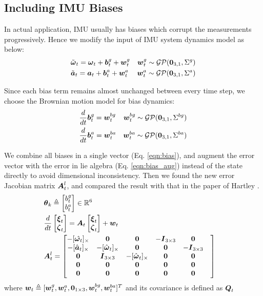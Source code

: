 \subsection{Including IMU Biases}
In actual application, IMU usually has biases which corrupt the measurements progressively. Hence we modify the input of IMU system dynamics model as below:
\begin{align}
    & \tilde{\boldsymbol{\omega}}_t = \boldsymbol{\omega}_t + \boldsymbol{b}^g_t + \boldsymbol{w}^g_t 
    & \boldsymbol{w}^g_t \sim \mathcal{GP}(\boldsymbol{0}_{3,1},\Sigma^g) \\
    & \tilde{\boldsymbol{a}}_t = \boldsymbol{a}_t + \boldsymbol{b}^a_t + \boldsymbol{w}^a_t
    & \boldsymbol{w}^a_t \sim \mathcal{GP}(\boldsymbol{0}_{3,1},\Sigma^a)
\end{align}

Since each bias term remains almost unchanged between every time step, we choose the Brownian motion model for bias dynamics: 
\begin{align}
    & \frac{d}{dt}\boldsymbol{b}^g_t = \boldsymbol{w}^{bg}_t 
    & \boldsymbol{w}^{bg}_t \sim \mathcal{GP}(\boldsymbol{0}_{3,1},\Sigma^{bg}) \\
    & \frac{d}{dt}\boldsymbol{b}^a_t = \boldsymbol{w}^{ba}_t
    & \boldsymbol{w}^{ba}_t \sim \mathcal{GP}(\boldsymbol{0}_{3,1},\Sigma^{ba})
\end{align}

We combine all biases in a single vector (Eq. \ref{eqn:bias}), and augment the error vector with the error in lie algebra (Eq. \ref{eqn:bias_aug}) instead of the state directly to avoid dimensional inconsistency. Then we found the new error Jacobian matrix $\boldsymbol{A}^l_t$, and compared the result with that in the paper of Hartley \cite{hartley2020iekf}.
\begin{align}
    &  \boldsymbol{\theta}_k \triangleq 
        \begin{bmatrix}
            b^g_t \\ b^a_t
        \end{bmatrix}
        \in \mathbb{R}^6
    &\label{eqn:bias}\\
    & \frac{d}{dt}\begin{bmatrix}\boldsymbol{\xi}_t\\\boldsymbol{\zeta}_t\end{bmatrix}=\boldsymbol{A}_t\begin{bmatrix}\boldsymbol{\xi}_t\\\boldsymbol{\zeta}_t\end{bmatrix} + \boldsymbol{w}_t
    &\label{eqn:bias_aug}\\
    & \boldsymbol{A}^l_t = 
    \begin{bmatrix}
    -[\hat{\boldsymbol{\omega}_t}]_\times & \boldsymbol{0} & \boldsymbol{0} & -\boldsymbol{I}_{3 \times 3} & \boldsymbol{0} & \\
    -[\hat{\boldsymbol{a}}_t]_\times & -[\hat{\boldsymbol{\omega}}_t]_\times & \boldsymbol{0} & \boldsymbol{0} & -\boldsymbol{I}_{3 \times 3} \\
    \boldsymbol{0} & \boldsymbol{I}_{3 \times 3} & -[\hat{\boldsymbol{\omega}}_t]_\times & \boldsymbol{0} & \boldsymbol{0} \\
    \boldsymbol{0} & \boldsymbol{0} & \boldsymbol{0} & \boldsymbol{0} & \boldsymbol{0} \\
    \boldsymbol{0} & \boldsymbol{0} & \boldsymbol{0} & \boldsymbol{0} & \boldsymbol{0}
    \end{bmatrix}
\end{align}
where $\boldsymbol{w}_t \triangleq [\boldsymbol{w}^g_t, \boldsymbol{w}^a_t, \boldsymbol{0}_{1 \times 3}, \boldsymbol{w}^{bg}_t, \boldsymbol{w}^{ba}_t]^T$ and its covariance is defined as $\boldsymbol{Q}_t$

